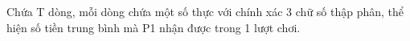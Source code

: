 Chứa T dòng, mỗi dòng chứa một số thực với chính xác 3 chữ số thập phân, thể hiện số tiền trung bình mà P1 nhận được trong 1 lượt chơi.